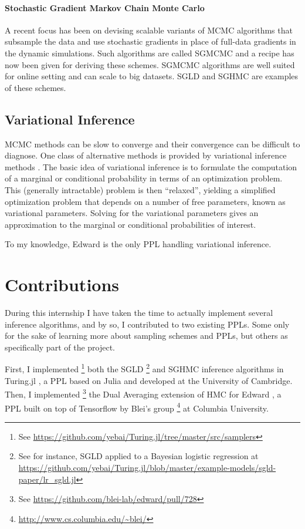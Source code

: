 \paragraph{Stochastic Gradient Markov Chain Monte Carlo}
A recent focus has been on devising scalable variants of \gls{MCMC} algorithms that subsample the data and use stochastic gradients in place of full-data gradients in the dynamic simulations. Such algorithms are called \gls{SGMCMC} and a recipe has now been given \cite{SGMCMC} for deriving these schemes. \gls{SGMCMC} algorithms are well suited for online setting and can scale to big datasets.
\gls{SGLD} \cite{SGLD} and \gls{SGHMC} \cite{SGHMC} are examples of these schemes.
 
 

\subsection{Variational Inference}

MCMC methods can be slow to converge and their convergence can be difficult to diagnose.
One class of alternative methods is provided by variational inference methods \cite{Jordan:1998ci,Ghahramani:2000:PAV:3008751.3008822}.
The basic idea of variational inference is to formulate the computation of a marginal
or conditional probability in terms of an optimization problem.
This (generally intractable) problem is then ``relaxed'', yielding a simplified optimization problem that
depends on a number of free parameters, known as variational parameters. Solving for the variational parameters gives an approximation to the marginal or conditional probabilities of interest.

To my knowledge, Edward \cite{Edward} is the only \gls{PPL} handling variational inference.

\section{Contributions}
During this internship I have taken the time to actually implement several inference algorithms, and by so, I contributed to two existing \glspl{PPL}.
Some only for the sake of learning more about sampling schemes and \glspl{PPL}, but others as specifically part of the project. 

First, I implemented \footnote{See \url{https://github.com/yebai/Turing.jl/tree/master/src/samplers}} both the \gls{SGLD} \footnote{See for instance, \gls{SGLD} applied to a Bayesian logistic regression at \url{https://github.com/yebai/Turing.jl/blob/master/example-models/sgld-paper/lr_sgld.jl}} and \gls{SGHMC} inference algorithms in Turing.jl \cite{Turing}, a \gls{PPL} based on Julia \cite{Bezanson:2017gd} and developed at the University of Cambridge.
Then, I implemented \footnote{See \url{https://github.com/blei-lab/edward/pull/728}} the Dual Averaging extension \cite{NUTS} of \gls{HMC} for Edward \cite{Edward}, a \gls{PPL} built on top of Tensorflow \cite{Tensorflow} by Blei's group \footnote{\url{http://www.cs.columbia.edu/~blei/}} at Columbia University.

